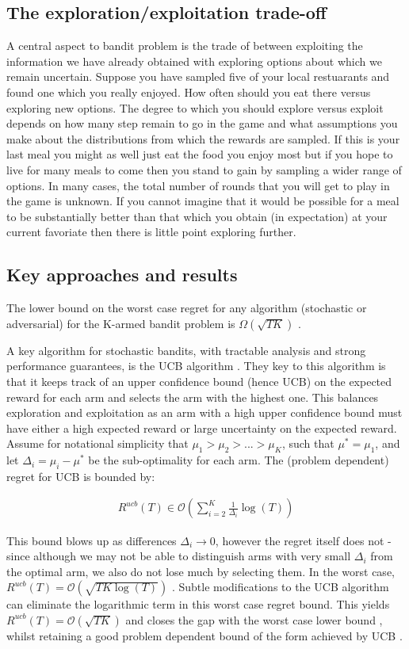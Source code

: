 \documentclass[11pt,a4paper,oneside]{book}
\newcommand{\eqn}[1]{\begin{align}#1\end{align}}
\newcommand{\bigo}[1]{\mathcal{O}\left( #1 \right)}
\newcommand{\bigomega}[1]{\Omega\left( #1 \right)}
\begin{document}
\subsection*{The exploration/exploitation trade-off}
A central aspect to bandit problem is the trade of between exploiting the information we have already obtained with exploring options about which we remain uncertain. Suppose you have sampled five of your local restuarants and found one which you really enjoyed. How often should you eat there versus exploring new options. The degree to which you should explore versus exploit depends on how many step remain to go in the game and what assumptions you make about the distributions from which the rewards are sampled. If this is your last meal you might as well just eat the food you enjoy most but if you hope to live for many meals to come then you stand to gain by sampling a wider range of options. In many cases, the total number of rounds that you will get to play in the game is unknown. If you cannot imagine that it would be possible for a meal to be substantially better than that which you obtain (in expectation) at your current favoriate then there is little point exploring further. 

\subsection*{Key approaches and results}

The lower bound on the worst case regret for any algorithm (stochastic or adversarial) for the K-armed bandit problem is  $\bigomega{\sqrt{TK}}$ \cite{Auer1995}.

A key algorithm for stochastic bandits, with tractable analysis and strong performance guarantees, is the UCB algorithm \cite{Auer2002}. They key to this algorithm is that it keeps track of an upper confidence bound (hence UCB) on the expected reward for each arm and selects the arm with the highest one. This balances exploration and exploitation as an arm with a high upper confidence bound must have either a high expected reward or large uncertainty on the expected reward. Assume for notational simplicity that $\mu_1 > \mu_2 > ... > \mu_K$, such that $\mu^* = \mu_1$, and let $\Delta_i = \mu_i - \mu^*$ be the sub-optimality for each arm. The (problem dependent) regret for UCB is bounded by: 

\eqn {
R^{ucb}(T) \in \bigo{\sum_{i=2}^K \frac{1}{\Delta_i}\log(T)}
}

This bound blows up as differences $\Delta_i \rightarrow 0$, however the regret itself does not - since although we may not be able to distinguish arms with very small $\Delta_i$ from the optimal arm, we also do not lose much by selecting them. In the worst case, $R^{ucb}(T) = \bigo{\sqrt{TK\log(T)}}$ \cite{Bubeck2012}. Subtle modifications to the UCB algorithm can eliminate the logarithmic term in this worst case regret bound. This yields $R^{ucb}(T) = \bigo{\sqrt{TK}}$ and closes the gap with the worst case lower bound \cite{Audibert2009,Lattimore2015}, whilst retaining a good problem dependent bound of the form achieved by UCB \cite{Lattimore2015}.
\end{document}
